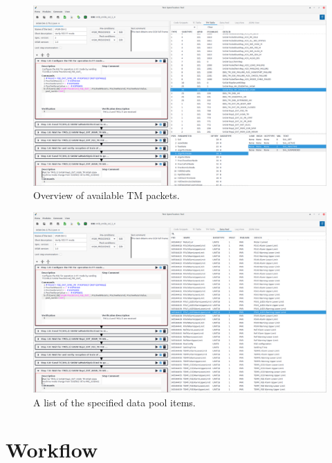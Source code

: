 \begin{figure}\label{fig:tmtab}
\includegraphics[width=1.\textwidth]{../shared/images/tmtab.png} 
\caption{Overview of available TM packets.}
\end{figure}

\begin{figure}\label{fig:tstdp}
\includegraphics[width=1.\textwidth]{../shared/images/datapool.png} 
\caption{A list of the specified data pool items.}
\end{figure}


\section{Workflow}


